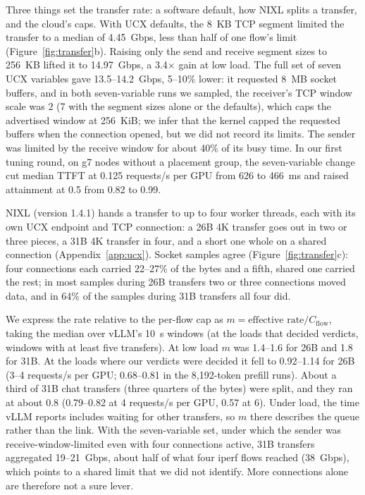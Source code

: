 \documentclass[11pt]{article}
\begin{document}
Three things set the transfer rate: a software default, how NIXL splits a transfer, and the cloud's caps. With UCX defaults, the 8~KB TCP segment limited the transfer to a median of 4.45~Gbps, less than half of one flow's limit (Figure~\ref{fig:transfer}b). Raising only the send and receive segment sizes to 256~KB lifted it to 14.97~Gbps, a 3.4$\times$ gain at low load. The full set of seven UCX variables gave 13.5--14.2~Gbps, 5--10\% lower: it requested 8~MB socket buffers, and in both seven-variable runs we sampled, the receiver's TCP window scale was 2 (7 with the segment sizes alone or the defaults), which caps the advertised window at 256~KiB; we infer that the kernel capped the requested buffers when the connection opened, but we did not record its limits. The sender was limited by the receive window for about 40\% of its busy time. In our first tuning round, on g7 nodes without a placement group, the seven-variable change cut median TTFT at 0.125 requests/s per GPU from 626 to 466~ms and raised attainment at 0.5 from 0.82 to 0.99.

NIXL (version 1.4.1) hands a transfer to up to four worker threads, each with its own UCX endpoint and TCP connection: a 26B 4K transfer goes out in two or three pieces, a 31B 4K transfer in four, and a short one whole on a shared connection (Appendix~\ref{app:ucx}). Socket samples agree (Figure~\ref{fig:transfer}c): four connections each carried 22--27\% of the bytes and a fifth, shared one carried the rest; in most samples during 26B transfers two or three connections moved data, and in 64\% of the samples during 31B transfers all four did.

We express the rate relative to the per-flow cap as $m = \text{effective rate} / C_{\mathrm{flow}}$, taking the median over vLLM's 10~s windows (at the loads that decided verdicts, windows with at least five transfers). At low load $m$ was 1.4--1.6 for 26B and 1.8 for 31B. At the loads where our verdicts were decided it fell to 0.92--1.14 for 26B (3--4 requests/s per GPU; 0.68--0.81 in the 8,192-token prefill runs). About a third of 31B chat transfers (three quarters of the bytes) were split, and they ran at about 0.8 (0.79--0.82 at 4 requests/s per GPU, 0.57 at 6). Under load, the time vLLM reports includes waiting for other transfers, so $m$ there describes the queue rather than the link. With the seven-variable set, under which the sender was receive-window-limited even with four connections active, 31B transfers aggregated 19--21~Gbps, about half of what four iperf flows reached (38~Gbps), which points to a shared limit that we did not identify. More connections alone are therefore not a sure lever.
\end{document}
